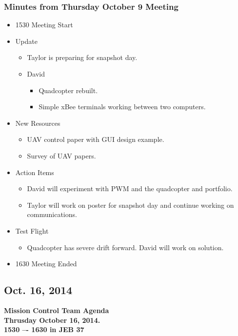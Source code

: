 \documentclass[pdftex,11pt]{article}
\begin{document}
\subsubsection[short]{Minutes from Thursday October 9 Meeting}
\begin{itemize}
	\item 1530 \indent Meeting Start
	\item Update
	\begin{itemize}
		\item  Taylor is preparing for snapshot day.
		\item David
		\begin{itemize}
			\item Quadcopter rebuilt.
			\item Simple xBee terminals working between two computers.
		\end{itemize}
	\end{itemize}
	\item New Resources
		\begin{itemize}
			\item UAV control paper with GUI design example.
			\item Survey of UAV papers.
		\end{itemize}
	\item Action Items
	\begin{itemize}
		\item David will experiment with PWM and the quadcopter and  portfolio.
		\item Taylor will work on poster for snapshot day and continue working on communications.
	\end{itemize}
	\item Test Flight
	\begin{itemize}
		\item  Quadcopter has severe drift forward. David will work on solution.
	\end{itemize}
	\item 1630 \indent Meeting Ended
\end{itemize}	




\subsection{Oct. 16, 2014}
{ \huge \bfseries Mission Control Team Agenda \\[0.4cm] }
{ \huge \bfseries Thrusday October 16, 2014.\\1530 –-  1630  in JEB 37\\[0.4cm] }
\vspace*{2.5mm}
\end{document}
